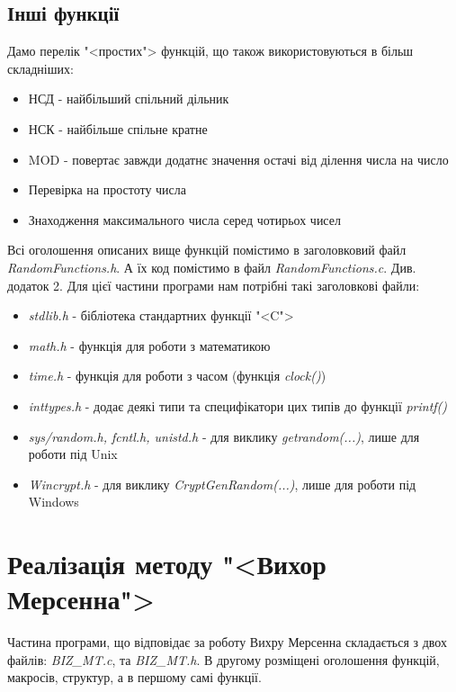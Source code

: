 \documentclass[oneside,final,14pt]{extreport}
\begin{document}
\begin{large}
\subsection{Інші функції}\label{ss:312}
	Дамо перелік "<простих"> функцій, що також використовуються в більш складніших:
	\begin{itemize}
		\item 
		НСД - найбільший спільний дільник
		\item
		НСК - найбільше спільне кратне
		\item
		MOD - повертає завжди додатнє значення остачі від ділення числа на число
		\item
		Перевірка на простоту числа
		\item
		Знаходження максимального числа серед чотирьох чисел
	\end{itemize}

Всі оголошення описаних вище функцій помістимо в заголовковий файл {\itshape RandomFunctions.h}. 
А їх код помістимо в файл {\itshape RandomFunctions.c}. Див. додаток 2. Для цієї частини програми нам 
потрібні такі заголовкові файли:
\begin{itemize}
	\item 
	{\itshape stdlib.h} - бібліотека стандартних функції "<C">
	\item 
	{\itshape math.h} - функція для роботи з математикою
	\item 
	{\itshape time.h} - функція для роботи з часом (функція {\itshape clock()})
	\item 
	{\itshape inttypes.h} - додає деякі типи та специфікатори цих типів до функції {\itshape printf()}
	\item 
	{\itshape sys/random.h, fcntl.h, unistd.h} - для виклику {\itshape getrandom(...)}, лише для роботи під Unix
	\item 
	{\itshape Wincrypt.h} - для виклику {\itshape CryptGenRandom(...)}, лише для роботи під Windows 
\end{itemize}

\section{Реалізація методу "<Вихор Мерсенна">}\label{s:32}
	Частина програми, що відповідає за роботу Вихру Мерсенна складається з двох файлів: 
	{\itshape BIZ\_MT.c}, та {\itshape BIZ\_MT.h}. В другому розміщені оголошення функцій, макросів, 
	структур, а в першому самі функції.

\end{large}
\end{document}

